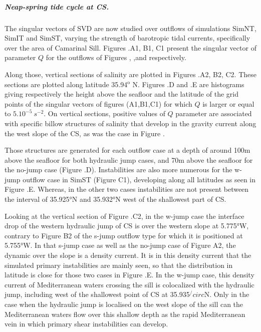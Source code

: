 \subparagraph{Neap-spring tide cycle at CS.}
The singular vectors of SVD are now studied over outflows of simulations SimNT, SimIT and SimST, varying the strength of barotropic tidal currents, specifically over the area of Camarinal Sill. Figures .A1, B1, C1 present the singular vector of parameter $Q$ for the outflows of Figures , ,and  respectively.

Along those, vertical sections of salinity are plotted in Figures .A2, B2, C2. These sections are plotted along latitude 35.94$^\text{o}$ N. Figures .D and .E are histograms giving respectively the height above the seafloor and the latitude of the grid points of the singular vectors of figures (A1,B1,C1) for which $Q$ is larger or equal to $5.10^{-5}\ s^{-2}$. On vertical sections, positive values of $Q$ parameter are associated with specific billow structures of salinity that develop in the gravity current along the west slope of the CS, as was the case in Figure . 

Those structures are generated for each outflow case at a depth of around 100m above the seafloor for both hydraulic jump cases, and 70m above the seafloor for the no-jump case (Figure .D). Instabilities are also more numerous for the w-jump outflow case in SimST (Figure C1), developing along all latitudes as seen in Figure .E. Whereas, in the other two cases instabilities are not present between the interval of 35.925°N and 35.932°N west of the shallowest part of CS.

Looking at the vertical section of Figure .C2, in the w-jump case the interface drop of the western hydraulic jump of CS is over the western slope at 5.775°W, contrary to Figure B2 of the s-jump outflow type for which it is positioned at 5.755°W. In that s-jump case as well as the no-jump case of Figure A2, the dynamic over the slope is a density current. It is in this density current that the simulated primary instabilities are mainly seen, so that the distribution in latitude is close for those two cases in Figure .E. In the w-jump case, this density current of Mediterranean waters crossing the sill is colocalized with the hydraulic jump, including west of the shallowest point of CS at 35.935$^/circ$N. Only in the case when the hydraulic jump is localised on the west slope of the sill can the Mediterranean waters flow over this shallow depth as the rapid Mediterranean vein in which primary shear instabilities can develop. 

